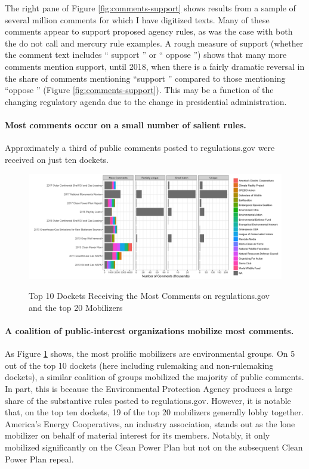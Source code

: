 The right pane of Figure \ref{fig:comments-support} shows results from a sample of several million comments for which I have digitized texts. Many of these comments appear to support proposed agency rules, as was the case with both the do not call and mercury rule examples. A rough measure of support (whether the comment text includes `` support '' or `` oppose '') shows that many more comments mention support, until 2018, when there is a fairly dramatic reversal in the share of comments mentioning ``support '' compared to those mentioning ``oppose '' (Figure \ref{fig:comments-support}). This may be a function of the changing regulatory agenda due to the change in presidential administration. 



\paragraph{Most comments occur on a small number of salient rules.} Approximately a third of public comments posted to regulations.gov were received on just ten dockets.


\begin{figure}
    \centering
        \caption{Top 10 Dockets Receiving the Most Comments on regulations.gov and the top 20 Mobilizers}
    \includegraphics[width = 6in]{Figs/topdockets.png}
    \label{fig:topdockets}
\end{figure}


\paragraph{A coalition of public-interest organizations mobilize most comments.} As Figure \ref{fig:topdockets} %
shows, the most prolific mobilizers are environmental groups. On 5 out of the top 10 dockets (here including rulemaking and non-rulemaking dockets), a similar coalition of groups mobilized the majority of public comments. In part, this is because the Environmental Protection Agency produces a large share of the substantive rules posted to regulations.gov. However, it is notable that, on the top ten dockets, 19 of the top 20 mobilizers generally lobby together. America's Energy Cooperatives, an industry association, stands out as the lone mobilizer on behalf of material interest for its members. Notably, it only mobilized significantly on the Clean Power Plan but not on the subsequent Clean Power Plan repeal. 
